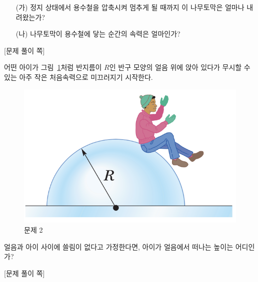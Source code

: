 \documentclass[floatfix,nofootinbib,superscriptaddress,fleqn,preprint]{revtex4}
\begin{document}
\begin{itemize}
\item[(가)] 정지 상태에서 용수철을 압축시켜 멈추게 될 때까지 이
  나무토막은 얼마나 내려왔는가?
\item[(나)] 나무토막이 용수철에 닿는 순간의 속력은 얼마인가?   
\end{itemize}

\newpage
{\color{gray} [문제 풀이 쪽]}

\newpage

어떤 아이가 그림~\ref{fig:2}처럼
반지름이 $R$인 반구 모양의 얼음 위에 앉아 있다가 무시할 수 있는 아주
작은 처음속력으로 미끄러지기 시작한다. 
\begin{figure}[ht]
  \centering
\includegraphics[scale=0.5]{Qfig9-3-20210330.png}  
  \caption{문제 2}
  \label{fig:2}
\end{figure}
얼음과 아이 사이에 쓸림이 없다고 가정한다면, 아이가 얼음에서 떠나는
높이는 어디인가?
  \newpage

{\color{gray} [문제 풀이 쪽]}

\newpage
\end{document}
